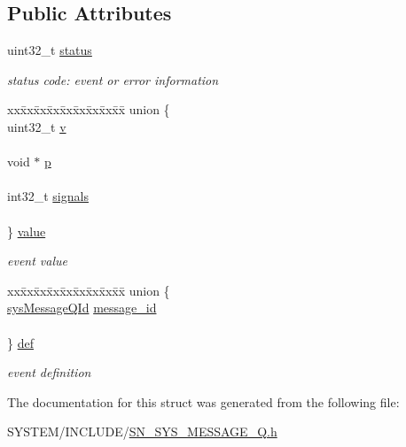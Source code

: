 \subsection*{Public Attributes}
\begin{DoxyCompactItemize}
\item 
\mbox{\label{structsysEvent_a97996ededf93d5aeb33ca5104f1a5d95}} 
uint32\+\_\+t \hyperlink{structsysEvent_a97996ededf93d5aeb33ca5104f1a5d95}{status}
\begin{DoxyCompactList}\small\item\em status code\+: event or error information \end{DoxyCompactList}\item 
\mbox{\label{structsysEvent_a0dd7049a24d252a37758fead3f0a2380}} 
\begin{tabbing}
xx\=xx\=xx\=xx\=xx\=xx\=xx\=xx\=xx\=\kill
union \{\\
\>uint32\_t \hyperlink{structsysEvent_a56a055cf017056e284d96ac197ac6e22}{v}\\
\>\\
\>void $\ast$ \hyperlink{structsysEvent_a387cb9c8e06db655010f576692979bfb}{p}\\
\>\\
\>int32\_t \hyperlink{structsysEvent_ab911ad1725519b9d6d5fea72d7b8d89b}{signals}\\
\>\\
\} \hyperlink{structsysEvent_a0dd7049a24d252a37758fead3f0a2380}{value}\\

\end{tabbing}\begin{DoxyCompactList}\small\item\em event value \end{DoxyCompactList}\item 
\mbox{\label{structsysEvent_afa01d1c1d694a6df0a748a92dfe47421}} 
\begin{tabbing}
xx\=xx\=xx\=xx\=xx\=xx\=xx\=xx\=xx\=\kill
union \{\\
\>\hyperlink{structmessage}{sysMessageQId} \hyperlink{structsysEvent_a4411241a7a31702b7bdfb3086db3a357}{message\_id}\\
\>\\
\} \hyperlink{structsysEvent_afa01d1c1d694a6df0a748a92dfe47421}{def}\\

\end{tabbing}\begin{DoxyCompactList}\small\item\em event definition \end{DoxyCompactList}\end{DoxyCompactItemize}


The documentation for this struct was generated from the following file\+:\begin{DoxyCompactItemize}
\item 
S\+Y\+S\+T\+E\+M/\+I\+N\+C\+L\+U\+D\+E/\hyperlink{SN__SYS__MESSAGE__Q_8h}{S\+N\+\_\+\+S\+Y\+S\+\_\+\+M\+E\+S\+S\+A\+G\+E\+\_\+\+Q.\+h}\end{DoxyCompactItemize}
